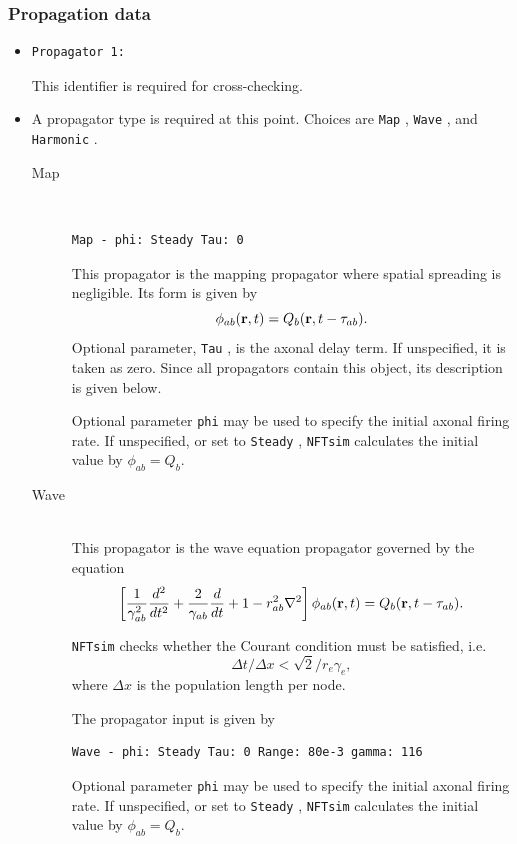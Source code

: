 \documentclass[12pt,a4paper]{article}
\newcommand{\type}[1]{{\small\small\tt #1} }
\newcommand{\NF}[0]{\type{NFTsim}}
\begin{document}
\subsubsection{Propagation data}
\label{sec:prop}
\begin{itemize}
\item
    \begin{lstlisting}
Propagator 1:
    \end{lstlisting}
    This identifier is required for cross-checking.
\item A propagator type is required at this point. Choices are \type{Map}, \type{Wave}, and \type{Harmonic}.
\begin{description}
    \item[Map]\ \\
    \begin{lstlisting}
Map - phi: Steady Tau: 0
    \end{lstlisting}
    This propagator is the mapping propagator where spatial spreading is negligible. Its form is given by
    \[\phi_{ab}({\bf r}, t) = Q_b ({\bf r}, t - \tau_{ab}).\]
    Optional parameter, \type{Tau}, is the axonal delay term. If unspecified, it is taken as zero. Since all propagators contain this object, its description is given below.

    Optional parameter \type{phi} may be used to specify the initial axonal firing rate. If unspecified, or set to \type{Steady}, \NF calculates the initial value by \(\phi_{ab}=Q_{b}\).

    \item[Wave]\ \\
    This propagator is the wave equation propagator governed by the equation
    \[\left[\frac{1}{\gamma_{ab}^2}\frac{d^2}{d t^2}+\frac{2}{\gamma_{ab}}\frac{d} {d t}+1 -r^2_{ab}\nabla^2 \right] \phi_{ab}({\bf r},t) =Q_b({\bf r},t-\tau_{ab}).\]

    \NF checks whether the Courant condition must be satisfied, i.e. \[\Delta t/\Delta x<\sqrt{2}/r_e\gamma_e,\] where $\Delta x$ is the population length per node.

    The propagator input is given by
    \begin{lstlisting}
Wave - phi: Steady Tau: 0 Range: 80e-3 gamma: 116
    \end{lstlisting}

    Optional parameter \type{phi} may be used to specify the initial axonal firing rate. If unspecified, or set to \type{Steady}, \NF calculates the initial value by \(\phi_{ab}=Q_{b}\).


\end{description}
\end{itemize}
\end{document}
